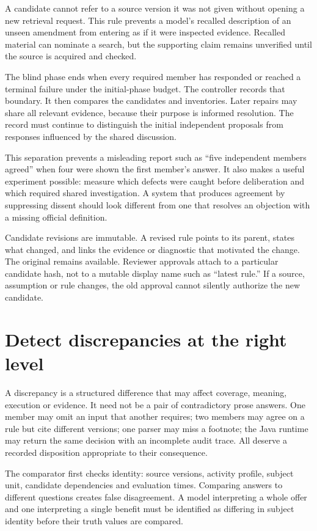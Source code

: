 \documentclass[12pt,a4paper,oneside,openany]{book}
\begin{document}
A candidate cannot refer to a source version it was not given without opening a
new retrieval request. This rule prevents a model's recalled description of an
unseen amendment from entering as if it were inspected evidence. Recalled
material can nominate a search, but the supporting claim remains unverified
until the source is acquired and checked.

The blind phase ends when every required member has responded or reached a
terminal failure under the initial-phase budget. The controller records that
boundary. It then compares the candidates and inventories. Later repairs may
share all relevant evidence, because their purpose is informed resolution. The
record must continue to distinguish the initial independent proposals from
responses influenced by the shared discussion.

This separation prevents a misleading report such as ``five independent members
agreed'' when four were shown the first member's answer. It also makes a useful
experiment possible: measure which defects were caught before deliberation and
which required shared investigation. A system that produces agreement by
suppressing dissent should look different from one that resolves an objection
with a missing official definition.

Candidate revisions are immutable. A revised rule points to its parent, states
what changed, and links the evidence or diagnostic that motivated the change.
The original remains available. Reviewer approvals attach to a particular
candidate hash, not to a mutable display name such as ``latest rule.'' If a
source, assumption or rule changes, the old approval cannot silently authorize
the new candidate.

\section{Detect discrepancies at the right level}

A discrepancy is a structured difference that may affect coverage, meaning,
execution or evidence. It need not be a pair of contradictory prose answers.
One member may omit an input that another requires; two members may agree on a
rule but cite different versions; one parser may miss a footnote; the Java
runtime may return the same decision with an incomplete audit trace. All deserve
a recorded disposition appropriate to their consequence.

The comparator first checks identity: source versions, activity profile, subject
unit, candidate dependencies and evaluation times. Comparing answers to different
questions creates false disagreement. A model interpreting a whole offer and one
interpreting a single benefit must be identified as differing in subject identity
before their truth values are compared.
\end{document}
